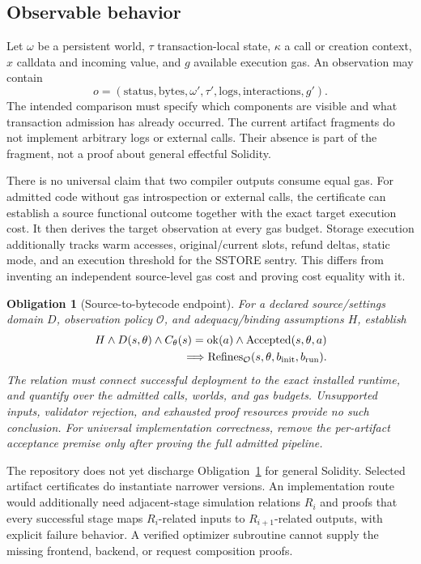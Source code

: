 \documentclass[conference]{IEEEtran}
\newtheorem{obligation}{Obligation}
\begin{document}
\subsection{Observable behavior}
Let $\omega$ be a persistent world, $\tau$ transaction-local state, $\kappa$
a call or creation context, $x$ calldata and incoming value, and $g$ available
execution gas. An observation may contain
\[
 o=(\text{status},\text{bytes},\omega',\tau',\text{logs},
       \text{interactions},g').
\]
The intended comparison must specify which components are visible and what
transaction admission has already occurred. The current artifact fragments do
not implement arbitrary logs or external calls. Their absence is part of the
fragment, not a proof about general effectful Solidity.

There is no universal claim that two compiler outputs consume equal gas.
For admitted code without gas introspection or external calls, the certificate
can establish a source functional outcome together with the exact target
execution cost. It then derives the target observation at every gas budget.
Storage execution additionally tracks warm accesses, original/current slots,
refund deltas, static mode, and an execution threshold for the SSTORE sentry.
This differs from inventing an independent source-level gas cost and proving
cost equality with it.

\begin{obligation}[Source-to-bytecode endpoint]\label{ob:end}
For a declared source/settings domain $D$, observation policy $\mathcal O$,
and adequacy/binding assumptions $H$, establish
\[
 \begin{split}
 H\land D(s,\theta)\land C_\theta(s)=\operatorname{ok}(a)
 \land\operatorname{Accepted}(s,\theta,a)\\
 {}\Longrightarrow
 \operatorname{Refines}_{\mathcal O}(s,\theta,b_{\rm init},b_{\rm run}).
 \end{split}
\]
The relation must connect successful deployment to the exact installed
runtime, and quantify over the admitted calls, worlds, and gas budgets.
Unsupported inputs, validator rejection, and exhausted proof resources provide
no such conclusion. For universal implementation correctness, remove the
per-artifact acceptance premise only after proving the full admitted pipeline.
\end{obligation}

The repository does not yet discharge Obligation~\ref{ob:end} for general
Solidity. Selected artifact certificates do instantiate narrower versions.
An implementation route would additionally need adjacent-stage simulation
relations $R_i$ and proofs that every successful stage maps $R_i$-related
inputs to $R_{i+1}$-related outputs, with explicit failure behavior. A verified
optimizer subroutine cannot supply the missing frontend, backend, or request
composition proofs.
\end{document}
